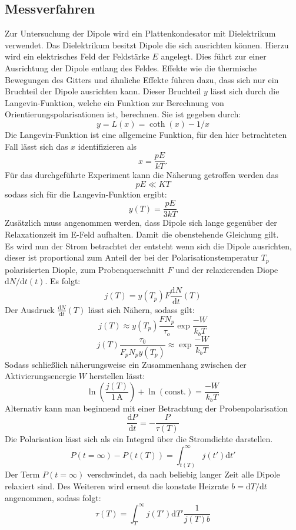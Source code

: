\subsection{Messverfahren}
Zur Untersuchung der Dipole wird ein Plattenkondesator mit
Dielektrikum verwendet. Das Dielektrikum besitzt Dipole  die sich
ausrichten können. Hierzu wird ein elektrisches
Feld der Feldstärke $E$ angelegt. Dies führt zur einer Ausrichtung der
Dipole entlang des Feldes. Effekte wie die thermische Bewegungen des Gitters und
ähnliche Effekte führen dazu, dass sich nur ein Bruchteil der Dipole ausrichten kann.
Dieser Bruchteil $y$ lässt sich durch die Langevin-Funktion, welche ein
Funktion zur Berechnung von Orientierungspolarisationen ist, berechnen.
Sie ist gegeben durch:
$$y=L(x)=\coth(x)-1/x$$
Die Langevin-Funktion ist eine allgemeine Funktion, für den hier
betrachteten Fall lässt sich das $x$ identifizieren als
$$x=\frac{pE}{kT}.$$
Für das durchgeführte Experiment kann die Näherung getroffen werden das
$$pE \ll KT$$
sodass sich für die Langevin-Funktion ergibt:
$$y(T)=\frac{pE}{3kT}$$
Zusätzlich muss angenommen werden, dass Dipole sich lange gegenüber der
Relaxationzeit im E-Feld aufhalten. Damit die obenstehende Gleichung
gilt.\\
Es wird nun der Strom betrachtet der entsteht wenn sich die Dipole ausrichten,
dieser ist proportional zum Anteil der bei der Polarisationstemperatur $T_p$
 polarisierten Diople, zum Probenquerschnitt $F$ und der relaxierenden Diope $\text{d}N/\text{d}t (t)$.
 Es folgt:
$$ j(T)=y(T_p)F \frac{\text{d}N}{\text{d}t}(T)$$
Der Ausdruck $\frac{\text{d}N}{\text{d}t}(T)$ lässt sich Nähern, sodass gilt:
$$j(T)\approx y(T_p)\frac{F N_p}{\tau_o} \exp{\frac{-W}{k_bT}}$$
$$j(T)\frac{\tau_0}{F_p N_p y(T_p)}\approx \exp{\frac{-W}{k_bT}} $$
Sodass schließlich näherungsweise ein Zusammenhang zwischen der Aktivierungsenergie $W$ herstellen lässt:
\begin{equation}
    \label{Formel5}
    \ln (\frac{j(T)}{1\,\text{A}})+ \ln(\text{const}.)=\frac{-W}{k_bT}
\end{equation}
Alternativ kann man beginnend mit einer Betrachtung der Probenpolarisation
$$ \frac{ \text{d}P}{\text{d}t}= - \frac{P}{\tau (T)}$$
Die Polarisation lässt sich als ein Integral über die Stromdichte darstellen.
$$P(t=\infty)-P(t(T))= \int_{t(T)}^{\infty} j(t')\text{d}t'$$
Der Term $P(t=\infty)$ verschwindet, da nach beliebig langer Zeit alle Dipole
relaxiert sind. Des Weiteren wird erneut die konstate Heizrate $b=\text{d}T/\text{d}t$
angenommen, sodass folgt:
$$ \tau(T)=\int_T^\infty j(T')\text{d}T' \frac{1}{j(T)b}$$
